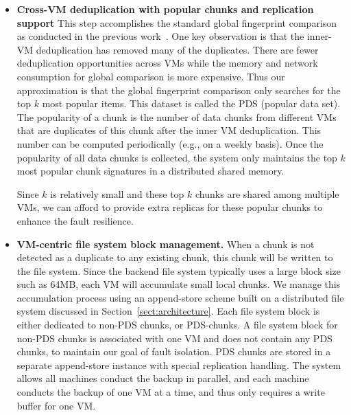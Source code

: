 \begin{itemize}
\item \textbf{Cross-VM deduplication with popular chunks and replication support}
This step accomplishes the standard global fingerprint comparison as conducted
in the previous work~\cite{WeiZhangIEEE}.
One key observation is that the inner-VM deduplication has removed many of the duplicates.
There are fewer deduplication opportunities across VMs while the memory and network
consumption for global comparison is more expensive.
Thus our approximation is that the global fingerprint comparison only searches for the top $k$
most popular items. This dataset is called the PDS (popular data set). 
The popularity of a chunk is the number  of data chunks  from different VMs
that are duplicates of this chunk after the inner VM deduplication.
This number can be computed periodically (e.g., on a weekly basis).
Once the popularity of all data chunks is collected, the system only maintains the top $k$
most popular chunk signatures in a distributed shared memory.  

Since $k$ is relatively small and these top $k$ chunks are shared among multiple VMs, 
we can afford to provide extra replicas for these popular chunks to enhance the fault resilience.

\item \textbf{VM-centric file system block management.}
When a chunk is not detected as a duplicate to any existing chunk, this chunk will be written
to the file system. Since the backend file system typically uses a large block size such as 64MB, each VM will 
accumulate small local chunks. We manage this accumulation process using an append-store  scheme built
on a distributed file system discussed  in Section~\ref{sect:architecture}.
Each file system block is either dedicated to non-PDS chunks, or PDS-chunks.
A file system block for non-PDS chunks is associated with one VM and does not contain
any PDS chunks, to maintain our goal of fault isolation.
PDS chunks are stored in a separate append-store instance with special replication handling. 
The system allows all machines conduct the backup in parallel, and each machine
conducts the backup of one VM at a time, and thus only requires a write  buffer for one VM.
\end{itemize}



